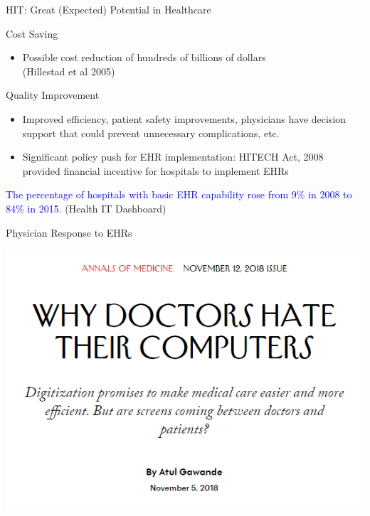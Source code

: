 \documentclass[10pt]{beamer}
\begin{document}
\begin{frame}[fragile]{HIT: Great (Expected) Potential in Healthcare}
\begin{alertblock}{Cost Saving}
\begin{itemize}
    \item Possible cost reduction of hundreds of billions of dollars \\ \scriptsize (Hillestad et al 2005)
\end{itemize}
\end{alertblock}

\begin{alertblock}{Quality Improvement}
\begin{itemize}
    \item Improved efficiency, patient safety improvements, physicians have decision support that could prevent unnecessary complications, etc.
    \item Significant policy push for EHR implementation: HITECH Act, 2008 provided financial incentive for hospitals to implement EHRs 
\end{itemize}
\end{alertblock}

\vspace{4mm}

\textcolor{blue}{The percentage of hospitals with basic EHR capability rose from 9$\%$ in 2008 to 84$\%$ in 2015.} \scriptsize (Health IT Dashboard)

\end{frame}


\begin{frame}[noframenumbering]{Physician Response to EHRs}
\begin{center}
    \includegraphics[scale=.5]{graphics/News Clip2.PNG}
\end{center}
\end{frame}
\end{document}
